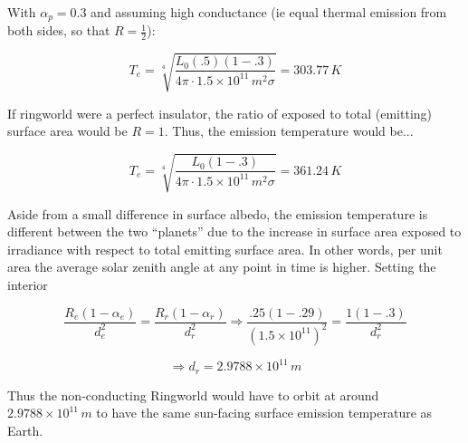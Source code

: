 \documentclass[12pt]{article}
\begin{document}
With $\alpha_p = 0.3$ and assuming high conductance (ie equal thermal emission from both sides, so that $R=\frac{1}{2}$):

\[
    T_e = \sqrt[4]{\frac{L_0 (.5) (1-.3)}{4\pi \cdot 1.5\times10^{11}\,\si{m}^2 \sigma}} = 303.77\,\si{K}
\]

If ringworld were a perfect insulator, the ratio of exposed to total (emitting) surface area would be $R=1$. Thus, the emission temperature would be...

\[
    T_e = \sqrt[4]{\frac{L_0 (1-.3)}{4\pi \cdot 1.5\times10^{11}\,\si{m}^2 \sigma}} = 361.24\,\si{K}
\]

Aside from a small difference in surface albedo, the emission temperature is different between the two ``planets'' due to the increase in surface area exposed to irradiance with respect to total emitting surface area. In other words, per unit area the average solar zenith angle at any point in time is higher. Setting the interior

\[
    \frac{R_e (1-\alpha_{e})}{d_e^2} = \frac{R_r (1-\alpha_{r})}{d_r^2} \Rightarrow \frac{.25 (1-.29)}{(1.5\times10^{11})^2} = \frac{1 (1-.3)}{d_r^2}
\]

\[
    \Rightarrow d_r = 2.9788\times 10^{11}\,\si{m}
\]

Thus the non-conducting Ringworld would have to orbit at around $2.9788\times 10^{11}\,\si{m}$ to have the same sun-facing surface emission temperature as Earth.
\end{document}
